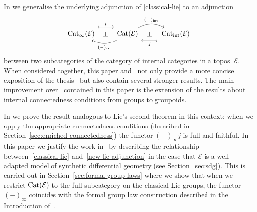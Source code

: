 \documentclass[10pt,a4paper]{amsart}
\numberwithin{equation}{section}
\begin{document}
In \cite{burke-relative-to-local-models} we generalise the underlying adjunction of \eqref{classical-lie} to an adjunction
\begin{equation}\label{new-lie-adjunction}
 \begin{tikzcd}
 {\rm Cat}_{\infty}(\mathcal{E}) \rar[phantom]{\perp} \rar[yshift=10,rightarrowtail]{i} & {\rm Cat}(\mathcal{E}) \rar[bend left]{(-)_{\rm int}} \lar[bend left]{(-)_{\infty}} & \lar[phantom]{\perp} \, {\rm Cat}_{\rm int}(\mathcal{E}) \lar[yshift=-10,rightarrowtail]{j}
 \end{tikzcd}
 \end{equation}
between two subcategories of the category of internal categories in a topos~$\mathcal{E}$. When considered together, this paper and~\cite{burke-relative-to-local-models} not only provide a more concise exposition of the thesis~\cite{BurkeThesis} but also contain several stronger results. The main improvement over~\cite{BurkeThesis} contained in this paper is the extension of the results about internal connectedness conditions from groups to groupoids.

In \cite{burke-relative-to-local-models} we prove the result analogous to Lie's second theorem in this context: when we apply the appropriate connectedness conditions (described in Section~\ref{sec:enriched-connectedness}) the functor $(-)_{\infty}j$ is full and faithful. In this paper we justify the work in~\cite{burke-relative-to-local-models} by describing the relationship between~\eqref{classical-lie} and~\eqref{new-lie-adjunction} in the case that $\mathcal{E}$ is a well-adapted model of synthetic dif\/ferential geometry (see Section~\ref{sec:sdg}). This is carried out in Section~\ref{sec:formal-group-laws} where we show that when we restrict ${\rm Cat}(\mathcal{E})$ to the full subcategory on the classical Lie groups, the functor $(-)_{\infty}$ coincides with the formal group law construction described in the Introduction of~\cite{MR506881}.
\end{document}
